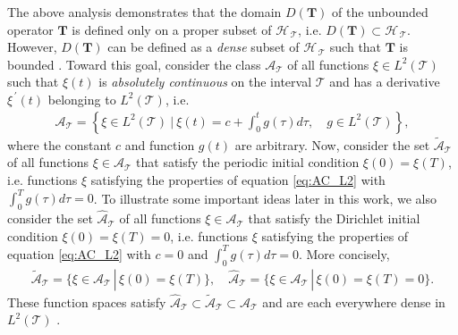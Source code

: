 \documentclass[11pt]{amsart}
\newcommand{\Tb}{\mathbf{T}}
\newcommand{\Tc}{\mathcal{T}}
\newcommand{\Hs}{\mathscr{H}}
\newcommand{\As}{\mathscr{A}}
\begin{document}
The above analysis demonstrates that the domain $D(\Tb)$ of the
unbounded operator $\Tb$ is defined only on a proper subset of $\Hs_{\,\Tc}$,
i.e. $D(\Tb)\subset\Hs_{\,\Tc}$. However, $D(\Tb)$ can be defined as a \emph{dense}
subset of $\Hs_{\,\Tc}$ such that $\Tb$ is bounded
\cite{Reed-1980,Stone:64}. Toward this goal, consider the class
$\As_{\Tc}$ of all functions $\xi\in L^2(\Tc)$ such that $\xi(t)$ is
\emph{absolutely continuous} \cite{Royden:1988:RA} on the interval
$\Tc$ and has a derivative $\xi^{\,\prime}(t)$ belonging to $L^2(\Tc)$,
i.e. \cite{Stone:64,Royden:1988:RA}   
%
\begin{align}\label{eq:AC_L2}
  \As_{\Tc}=
     \left\{
       \xi\in L^2(\Tc) \ \Big| \ \xi(t)=c+\int_0^tg(\tau)d\tau,
       \quad  g\in L^2(\Tc)
     \right\},
\end{align}
%
where the constant $c$ and function $g(t)$ are
arbitrary. Now, consider the set $\tilde{\As}_{\Tc}$ of all
functions $\xi\in\As_{\Tc}$ that satisfy the periodic initial condition
$\xi(0)=\xi(T)$, i.e. functions $\xi$ satisfying the properties of 
equation \eqref{eq:AC_L2} with $\int_0^Tg(\tau)d\tau=0$. To illustrate some
important ideas later in this work, we also consider the
set $\hat{\As}_{\Tc}$ of all functions $\xi\in\As_{\Tc}$ that satisfy the
Dirichlet initial condition $\xi(0)=\xi(T)=0$, i.e. functions $\xi$
satisfying the properties of equation \eqref{eq:AC_L2} with $c=0$ and
$\int_0^Tg(\tau)d\tau=0$. More concisely, 
%
\begin{align}\label{eq:AC_BC}
  \tilde{\As}_{\Tc}=\{\xi\in\As_{\Tc} \,|\, \xi(0)=\xi(T)\}, \quad
  \hat{\As}_{\Tc}=\{\xi\in\As_{\Tc} \,|\, \xi(0)=\xi(T)=0\}.
\end{align}
%
These function spaces satisfy
$\hat{\As}_{\Tc}\subset\tilde{\As}_{\Tc}\subset\As_{\Tc}$ and are each everywhere
dense in $L^2(\Tc)$ \cite{Stone:64}. 
\end{document}
